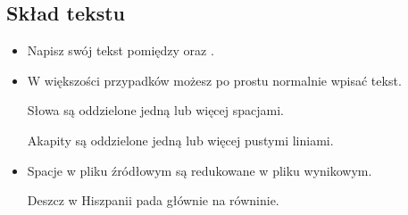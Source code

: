 \documentclass{beamer}
\begin{document}
\subsection{Skład tekstu}
\begin{frame}[fragile]{\insertsubsection{}}
\small
\begin{itemize}
\item Napisz swój tekst pomiędzy  oraz .
\item W większości przypadków możesz po prostu normalnie wpisać tekst.
\begin{exampletwouptiny}
Słowa są oddzielone jedną lub więcej
spacjami.

Akapity są oddzielone jedną lub więcej 
pustymi liniami.
\end{exampletwouptiny}
\item Spacje w pliku źródłowym są redukowane w pliku wynikowym.
\begin{exampletwouptiny}
Deszcz    w    Hiszpanii     pada 
głównie        na       równinie.
\end{exampletwouptiny}
\end{itemize}
\end{frame}
\end{document}
